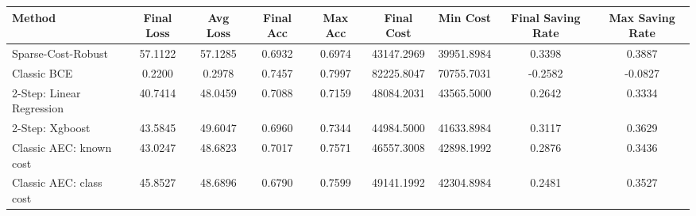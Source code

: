 \begin{tabular}{lcccccccc}
\toprule
Method & Final Loss & Avg Loss & Final Acc & Max Acc & Final Cost & Min Cost & Final Saving Rate & Max Saving Rate \\
\midrule
Sparse-Cost-Robust & 57.1122 & 57.1285 & 0.6932 & 0.6974 & 43147.2969 & 39951.8984 & 0.3398 & 0.3887 \\
Classic BCE & 0.2200 & 0.2978 & 0.7457 & 0.7997 & 82225.8047 & 70755.7031 & -0.2582 & -0.0827 \\
2-Step: Linear Regression & 40.7414 & 48.0459 & 0.7088 & 0.7159 & 48084.2031 & 43565.5000 & 0.2642 & 0.3334 \\
2-Step: Xgboost & 43.5845 & 49.6047 & 0.6960 & 0.7344 & 44984.5000 & 41633.8984 & 0.3117 & 0.3629 \\
Classic AEC: known cost & 43.0247 & 48.6823 & 0.7017 & 0.7571 & 46557.3008 & 42898.1992 & 0.2876 & 0.3436 \\
Classic AEC: class cost & 45.8527 & 48.6896 & 0.6790 & 0.7599 & 49141.1992 & 42304.8984 & 0.2481 & 0.3527 \\
\bottomrule
\end{tabular}

